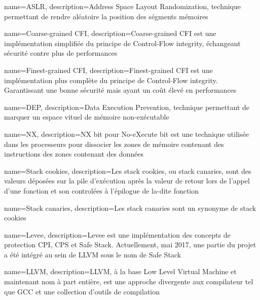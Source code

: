 


{
	name=ASLR,
	description={Address Space Layout Randomization, technique permettant de rendre aléatoire la position des ségments mémoires}
}

{
	name=Coarse-grained CFI,
	description={Coarse-grained CFI est une implémentation simplifiée du principe de Control-Flow integrity, échangeant sécurité contre plus de performances}
}

{
	name=Finest-grained CFI,
	description={Finest-grained CFI est une implémentation plus complète du principe de Control-Flow integrity. Garantissant une bonne sécurité mais ayant un coût élevé en performances}
}

{
	name=DEP,
	description={Data Execution Prevention, technique permettant de marquer un espace vituel de mémoire non-exécutable}
}

{
	name=NX,
	description={NX bit pour No-eXecute bit est une technique utilisée dans les processeurs pour dissocier les zones de mémoire contenant des instructions des zones contenant des données}
}

{
	name={Stack cookies},
	description={Les stack cookies, ou stack canaries, sont des valeurs déposées sur la pile d'exécution après la valeur de retour lors de l'appel d'une fonction et son controlées à l'épilogue de la-dite fonction}
}

{
	name={Stack canaries},
	description={Les stack canaries sont un synonyme de stack cookies}
}

{
	name={Levee},
	description={Levee est une implémentation des concepts de protection CPI, CPS et Safe Stack. Actuellement, mai 2017, une partie du projet a été intégré au sein de LLVM sous le nom de Safe Stack}
}

{
	name={LLVM},
	description={LLVM, à la base Low Level Virtual Machine et maintenant nom à part entière, est une approche divergente aux compilateur tel que GCC et une collection d'outils de compilation}
}

